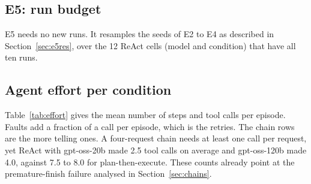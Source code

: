 \documentclass[10pt,a4paper,twocolumn]{article}
\begin{document}
\subsection{E5: run budget}
E5 needs no new runs. It resamples the seeds of E2 to E4 as described in Section~\ref{sec:e5res}, over the 12 ReAct cells
(model and condition) that have all ten runs.

\subsection{Agent effort per condition}
Table~\ref{tab:effort} gives the mean number of steps and tool calls per episode. Faults add a fraction of a call per
episode, which is the retries. The chain rows are the more telling ones. A four-request chain needs at least one call
per request, yet ReAct with gpt-oss-20b made 2.5 tool calls on average and gpt-oss-120b made 4.0, against 7.5 to 8.0 for
plan-then-execute. These counts already point at the premature-finish failure analysed in Section~\ref{sec:chains}.
\end{document}
